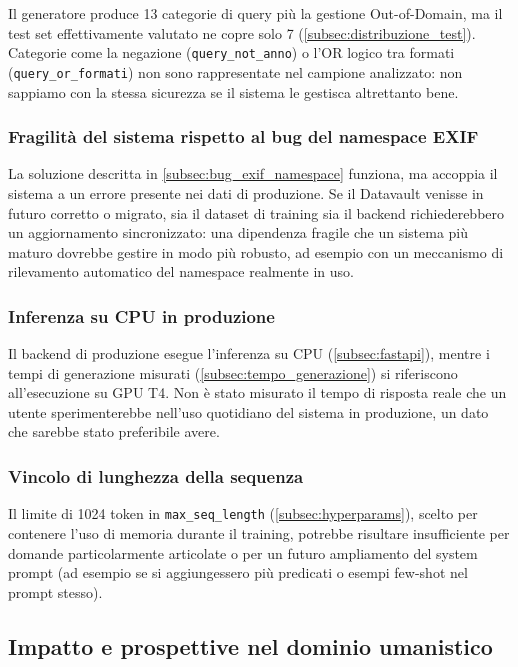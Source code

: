\documentclass[12pt,a4paper,oneside]{book}
\newcommand{\code}[1]{\colorbox{light-gray}{\texttt{#1}}}
\begin{document}
Il generatore produce 13 categorie di query più la gestione Out-of-Domain, ma il test set effettivamente valutato ne copre solo 7 (\cref{subsec:distribuzione_test}). Categorie come la negazione (\code{query\_not\_anno}) o l'OR logico tra formati (\code{query\_or\_formati}) non sono rappresentate nel campione analizzato: non sappiamo con la stessa sicurezza se il sistema le gestisca altrettanto bene.

\subsubsection{Fragilità del sistema rispetto al bug del namespace EXIF}

La soluzione descritta in \cref{subsec:bug_exif_namespace} funziona, ma accoppia il sistema a un errore presente nei dati di produzione. Se il Datavault venisse in futuro corretto o migrato, sia il dataset di training sia il backend richiederebbero un aggiornamento sincronizzato: una dipendenza fragile che un sistema più maturo dovrebbe gestire in modo più robusto, ad esempio con un meccanismo di rilevamento automatico del namespace realmente in uso.

\subsubsection{Inferenza su CPU in produzione}

Il backend di produzione esegue l'inferenza su CPU (\cref{subsec:fastapi}), mentre i tempi di generazione misurati (\cref{subsec:tempo_generazione}) si riferiscono all'esecuzione su GPU T4. Non è stato misurato il tempo di risposta reale che un utente sperimenterebbe nell'uso quotidiano del sistema in produzione, un dato che sarebbe stato preferibile avere.

\subsubsection{Vincolo di lunghezza della sequenza}

Il limite di 1024 token in \code{max\_seq\_length} (\cref{subsec:hyperparams}), scelto per contenere l'uso di memoria durante il training, potrebbe risultare insufficiente per domande particolarmente articolate o per un futuro ampliamento del system prompt (ad esempio se si aggiungessero più predicati o esempi few-shot nel prompt stesso).

\subsection{Impatto e prospettive nel dominio umanistico}\label{subsec:giustificazione}
\end{document}
